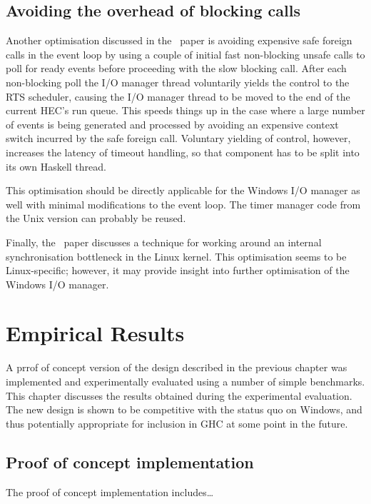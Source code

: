 \documentclass[a4paper,11pt,oneside]{report}
\begin{document}
\section{Avoiding the overhead of blocking calls}

Another optimisation discussed in the~\cite{bib:voellmy} paper is avoiding
expensive safe foreign calls in the event loop by using a couple of initial fast
non-blocking unsafe calls to poll for ready events before proceeding with the
slow blocking call. After each non-blocking poll the I/O manager thread
voluntarily yields the control to the RTS scheduler, causing the I/O manager
thread to be moved to the end of the current HEC's run queue. This speeds things
up in the case where a large number of events is being generated and processed
by avoiding an expensive context switch incurred by the safe foreign
call. Voluntary yielding of control, however, increases the latency of timeout
handling, so that component has to be split into its own Haskell thread.

This optimisation should be directly applicable for the Windows I/O manager as
well with minimal modifications to the event loop. The timer manager code from
the Unix version can probably be reused.

Finally, the~\cite{bib:voellmy} paper discusses a technique for working around
an internal synchronisation bottleneck in the Linux kernel. This optimisation
seems to be Linux-specific; however, it may provide insight into further
optimisation of the Windows I/O manager.

\chapter{Empirical Results}
\label{chap:evaluation}

A prrof of concept version of the design described in the previous chapter was
implemented and experimentally evaluated using a number of simple
benchmarks. This chapter discusses the results obtained during the experimental
evaluation. The new design is shown to be competitive with the status quo on
Windows, and thus potentially appropriate for inclusion in GHC at some point in
the future.

\section{Proof of concept implementation}

The proof of concept implementation includes\ldots
\end{document}
